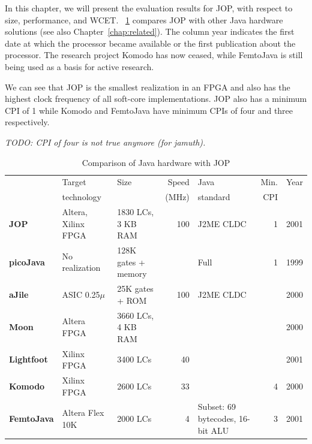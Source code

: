 
In this chapter, we will present the evaluation results for JOP, with
respect to size, performance, and WCET.
\tablename~\ref{tab_results_proc} compares JOP with other Java
hardware solutions (see also Chapter~\ref{chap:related}). The column
year indicates the first date at which the processor became available
or the first publication about the processor. The research project
Komodo has now ceased, while FemtoJava is still being used as a basis
for active research.

We can see that JOP is the smallest realization in an FPGA and also
has the highest clock frequency of all soft-core implementations. JOP
also has a minimum CPI of 1 while Komodo and FemtoJava have minimum
CPIs of four and three respectively.

\emph{TODO: CPI of four is not true anymore (for jamuth).}

\begin{table}[tbh]
    \centering
{\footnotesize
\begin{tabular}
    {|>{\bfseries}m{1.6cm}|>{\raggedright}m{1.6cm}|>{\raggedright}m{1.7cm}|r|>{\raggedright}m{2cm}|r|r|}

    \hline
         & Target  & Size & Speed & Java     & Min.  & Year \\
         & technology &      & (MHz) & standard & CPI  & \\
    \hline
    JOP & Altera, Xilinx FPGA & 1830 LCs, 3 KB RAM & 100 & J2ME CLDC & 1 & 2001 \\
    \hline
    picoJava & No realization & 128K gates + memory &  & Full & 1 & 1999 \\
    \hline
    aJile & ASIC 0.25$\mu$ & 25K gates + ROM & 100 & J2ME CLDC &  &  2000 \\
    \hline
    Moon & Altera FPGA & 3660 LCs, 4 KB RAM &  &  &  &  2000 \\
    \hline
    Lightfoot & Xilinx FPGA & 3400 LCs & 40 &  &  &  2001 \\
    \hline
    Komodo & Xilinx FPGA & 2600 LCs & 33 & & 4 & 2000 \\
    \hline
    FemtoJava & Altera Flex 10K & 2000 LCs & 4 & Subset: 69 bytecodes, 16-bit ALU & 3  & 2001 \\
    \hline

\end{tabular}
}
    \caption{Comparison of Java hardware with JOP}
    \label{tab_results_proc}
\end{table}

